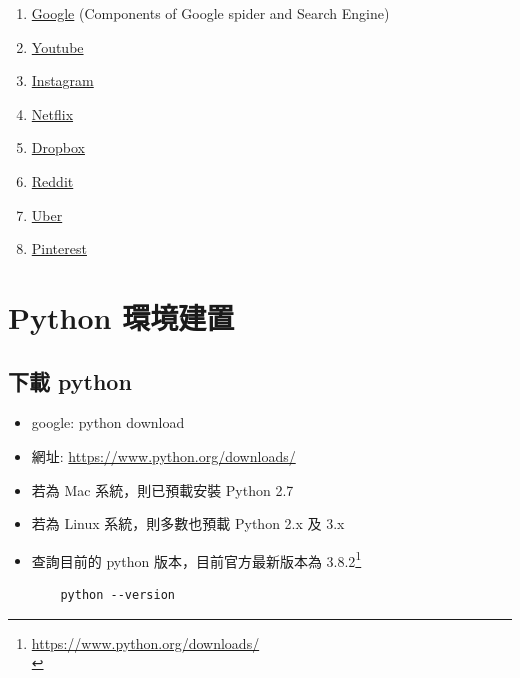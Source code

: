 \documentclass[a4paper,12pt]{article}
\begin{document}
\begin{enumerate}
\label{sec:org9f5feb6}
\begin{enumerate}
\item \href{https://www.google.com/}{Google} (Components of Google spider and Search Engine)\\
\item \href{https://www.youtube.com/channel/UCNJIEbGZaScUDsq\_DMYTjYg}{Youtube}\\
\item \href{https://www.instagram.com/}{Instagram}\\
\item \href{https://www.netflix.com/}{Netflix}\\
\item \href{https://www.dropbox.com/}{Dropbox}\\
\item \href{https://www.reddit.com/}{Reddit}\\
\item \href{https://www.uber.com/}{Uber}\\
\item \href{https://www.pinterest.com/}{Pinterest}\\
\end{enumerate}

\newpage
\end{enumerate}

\section{Python 環境建置}
\label{py-environment}
\subsection{下載 python}
\label{sec:orgefd498b}
\begin{itemize}
\item google: python download\\
\item 網址: \href{https://www.python.org/downloads/}{https://www.python.org/downloads/}\\
\item 若為 Mac 系統，則已預載安裝 Python 2.7\\
\item 若為 Linux 系統，則多數也預載 Python 2.x 及 3.x\\
\item 查詢目前的 python 版本，目前官方最新版本為 3.8.2\footnote{\href{https://www.python.org/downloads/}{https://www.python.org/downloads/}\\}\\
\lstset{breaklines=true,language=shell,label= ,caption= ,captionpos=b,numbers=none}
\begin{lstlisting}
    python --version
\end{lstlisting}
\end{itemize}
\end{document}
